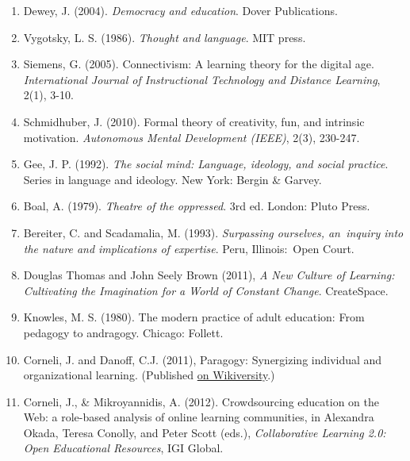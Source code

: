 \begin{enumerate}
\item
  Dewey, J. (2004). \emph{Democracy and education}. Dover Publications.
\item
  Vygotsky, L. S. (1986). \emph{Thought and language}. MIT press.
\item
  Siemens, G. (2005). Connectivism: A learning theory for the digital
  age. \emph{International Journal of Instructional Technology and
  Distance Learning}, 2(1), 3-10.
\item
  Schmidhuber, J. (2010). Formal theory of creativity, fun, and
  intrinsic motivation. \emph{Autonomous Mental Development (IEEE)},
  2(3), 230-247.
\item
  Gee, J. P. (1992). \emph{The social mind: Language, ideology, and
  social practice}. Series in language and ideology. New York: Bergin \&
  Garvey.
\item
  Boal, A. (1979). \emph{Theatre of the oppressed}. 3rd ed. London:
  Pluto Press.
\item
  Bereiter, C. and Scadamalia, M. (1993). \emph{Surpassing ourselves,
  an~inquiry into the nature and implications of expertise}. Peru,
  Illinois:~Open Court.
\item
  Douglas Thomas and John Seely Brown (2011), \emph{A New Culture of
  Learning: Cultivating the Imagination for a World of Constant Change}.
  CreateSpace.
\item
  Knowles, M. S. (1980). The modern practice of adult education: From
  pedagogy to andragogy. Chicago: Follett.
\item
  Corneli, J. and Danoff, C.J. (2011), Paragogy: Synergizing individual
  and organizational learning. (Published
  \href{\%20http://en.wikiversity.org/wiki/User:Arided/ParagogyPaper}{on
  Wikiversity}.)
\item
  Corneli, J., \& Mikroyannidis, A. (2012). Crowdsourcing education on
  the Web: a role-based analysis of online learning communities, in
  Alexandra Okada, Teresa Conolly, and Peter Scott (eds.),
  \emph{Collaborative Learning 2.0: Open Educational Resources}, IGI
  Global.
\end{enumerate}

~

